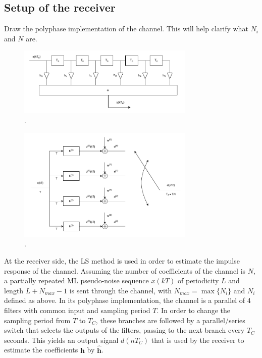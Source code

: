 \documentclass[10pt]{article}
\begin{document}
\subsection*{Setup of the receiver}
Draw the polyphase implementation of the channel. This will help clarify what $N_i$ and $N$ are.

\begin{figure}[ht]
	\centering
	\includegraphics[width=0.75\textwidth]{channel_model}
	\caption{.}
    \label{fig:channel_model}
\end{figure}

\begin{figure}[ht]
	\centering
	\includegraphics[width=0.75\textwidth]{polyphase}
	\caption{.}
    \label{fig:polyphase}
\end{figure}

At the receiver side, the LS method is used in order to estimate the impulse response of the channel. Assuming the number of coefficients of the channel is $N$, a partially repeated ML pseudo-noise sequence $x(kT)$ of periodicity $L$ and length $L + N_{max} - 1$ is sent through the channel, with $N_{max} = \max \{N_i\}$ and $N_i$ defined as above. In its polyphase implementation, the channel is a parallel of 4 filters with common input and sampling period $T$. In order to change the sampling period from $T$ to $T_C$, these branches are followed by a parallel/series switch that selects the outputs of the filters, passing to the next branch every $T_C$ seconds. This yields an output signal $d(nT_C)$ that is used by the receiver to estimate the coefficients $\mathbf{h}$ by $\mathbf{\hat{h}}$.
\end{document}
